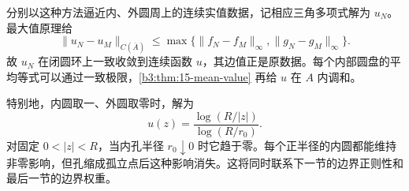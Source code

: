 \ProseParagraphBreak
分别以这种方法逼近内、外圆周上的连续实值数据，记相应三角多项式解为 \(u_N\)。最大值原理给
\[
 \|u_N-u_M\|_{C(\overline A)}
 \le\max\{\|f_N-f_M\|_\infty,\|g_N-g_M\|_\infty\}.
\]
故 \(u_N\) 在闭圆环上一致收敛到连续函数 \(u\)，其边值正是原数据。每个内部圆盘的平均等式可以通过一致极限，\cref{b3:thm:15-mean-value} 再给 \(u\) 在 \(A\) 内调和。

\ProseParagraphBreak
特别地，内圆取一、外圆取零时，解为
\[
 u(z)=\frac{\log(R/|z|)}{\log(R/r_0)}.
\]
对固定 \(0<|z|<R\)，当内孔半径 \(r_0\downarrow0\) 时它趋于零。每个正半径的内圆都能维持非零影响，但孔缩成孤立点后这种影响消失。这将同时联系下一节的边界正则性和最后一节的边界权重。
